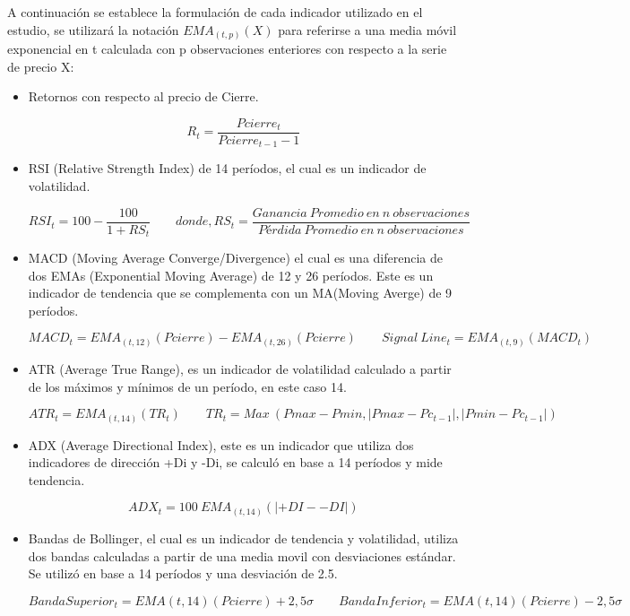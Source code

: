 \documentclass[a4paper,12pt]{Latex/Classes/PhDthesisPSnPDF}
\begin{document}
A continuación se establece la formulación de cada indicador utilizado en el estudio, se utilizará la notación $EMA_{(t, p)}(X)$ para referirse a una media móvil exponencial en t calculada con p observaciones enteriores con respecto a la serie de precio X:

\begin{itemize}
\item Retornos con respecto al precio de Cierre.

$$ R_{t} = \frac{Pcierre_{t}}{Pcierre_{t-1}-1}$$

\item RSI (Relative Strength Index) de 14 períodos, el cual es un indicador de volatilidad.

$$ RSI_{t} = 100 - \frac{100}{1 + RS_{t}} \qquad 
donde, RS_{t} = \frac{Ganancia\ Promedio\ en\ n\ observaciones}{Pérdida\ Promedio\ en\ n\ observaciones}$$

\item MACD (Moving Average Converge/Divergence) el cual es una diferencia de dos EMAs (Exponential Moving Average) de 12 y 26 períodos. Este es un indicador de tendencia que se complementa con un MA(Moving Averge) de 9 períodos. 

$$ MACD_{t} =  EMA_{(t, 12)}(Pcierre) - EMA_{(t, 26)}(Pcierre) \qquad
Signal\ Line_{t} = EMA_{(t, 9)}(MACD_{t}) $$

\item ATR (Average True Range), es un indicador de volatilidad calculado a partir de los máximos y mínimos de un período, en este caso 14.

$$ ATR_{t} =  EMA_{(t, 14)}(TR_{t}) \qquad
TR_{t} = Max\ (Pmax - Pmin, |Pmax - Pc_{t-1}|, |Pmin - Pc_{t-1}|)$$

\item ADX (Average Directional Index), este es un indicador que utiliza dos indicadores de dirección +Di y -Di, se calculó en base a 14 períodos y mide tendencia.

$$ ADX_{t} =  100\ EMA_{(t, 14)}(|+DI - -DI|)$$

\item Bandas de Bollinger, el cual es un indicador de tendencia y volatilidad, utiliza dos bandas calculadas a partir de una media movil con desviaciones estándar. Se utilizó en base a 14 períodos y una desviación de 2.5.

$$ Banda Superior_{t} = EMA{(t, 14)}(Pcierre) + 2,5\sigma \qquad 
Banda Inferior_{t} = EMA{(t, 14)}(Pcierre) - 2,5\sigma $$

\end{itemize}
\end{document}
